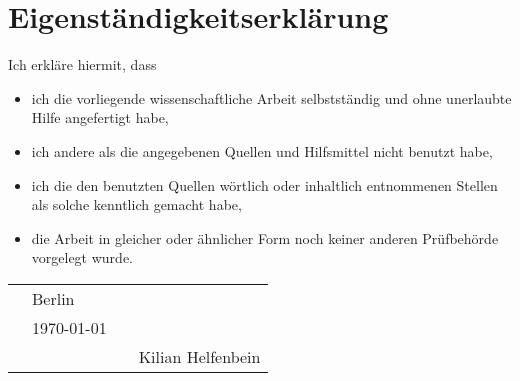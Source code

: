 
\section*{Eigenständigkeitserklärung}

\vspace{1cm}

Ich erkläre hiermit, dass

\begin{itemize}
	\item ich die vorliegende wissenschaftliche Arbeit selbstständig und ohne unerlaubte Hilfe angefertigt habe,
	\item ich andere als die angegebenen Quellen und Hilfsmittel nicht benutzt habe,
	\item ich die den benutzten Quellen wörtlich oder inhaltlich entnommenen Stellen als solche kenntlich gemacht habe, 
	\item die Arbeit in gleicher oder ähnlicher Form noch keiner anderen Prüfbehörde vorgelegt wurde.
\end{itemize}

\vspace{1cm}

\begin{tabular}{p{10mm}>{\centering\arraybackslash}p{50mm}p{10mm}>{\centering\arraybackslash}p{50mm}}
	&	{\large Berlin}	&	&									\\
	&	{\large \today}	& 	&	\hrulefill 						\\
	&					&	&	{\small Kilian Helfenbein}	
\end{tabular}

\newpage